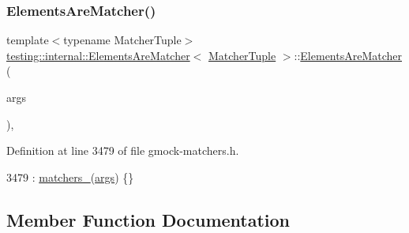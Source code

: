 \subsubsection{\texorpdfstring{Elements\+Are\+Matcher()}{ElementsAreMatcher()}}
{\footnotesize\ttfamily template$<$typename Matcher\+Tuple$>$ \\
\hyperlink{classtesting_1_1internal_1_1ElementsAreMatcher}{testing\+::internal\+::\+Elements\+Are\+Matcher}$<$ \hyperlink{structtesting_1_1internal_1_1MatcherTuple}{Matcher\+Tuple} $>$\+::\hyperlink{classtesting_1_1internal_1_1ElementsAreMatcher}{Elements\+Are\+Matcher} (\begin{DoxyParamCaption}\item[{const \hyperlink{structtesting_1_1internal_1_1MatcherTuple}{Matcher\+Tuple} \&}]{args }\end{DoxyParamCaption})\hspace{0.3cm}{\ttfamily [inline]}, {\ttfamily [explicit]}}



Definition at line 3479 of file gmock-\/matchers.\+h.


\begin{DoxyCode}
3479 : \hyperlink{classtesting_1_1internal_1_1ElementsAreMatcher_a3e7acc958d30ad5303e8e126d2d1c11e}{matchers\_}(\hyperlink{namespacegenerate__debs_a75f9143e38df82d83b2e8a6f99cae02c}{args}) \{\}
\end{DoxyCode}


\subsection{Member Function Documentation}
\mbox{\label{classtesting_1_1internal_1_1ElementsAreMatcher_af5baeeb499b9215912c5c51fbf2a4d2a}} 

